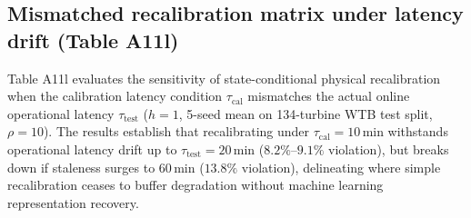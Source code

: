 \documentclass[
  journal]{IEEEtran}
\begin{document}
\FloatBarrier

\subsection*{Mismatched recalibration matrix under latency drift (Table
A11l)}\label{mismatched-recalibration-matrix-under-latency-drift-table-a11l}

Table A11l evaluates the sensitivity of state-conditional physical
recalibration when the calibration latency condition
\(\tau_{\mathrm{cal}}\) mismatches the actual online operational latency
\(\tau_{\mathrm{test}}\) (\(h=1\), 5-seed mean on 134-turbine WTB test
split, \(\rho=10\)). The results establish that recalibrating under
\(\tau_{\mathrm{cal}} = 10\,\)min withstands operational latency drift
up to \(\tau_{\mathrm{test}} = 20\,\)min (\(8.2\%\text{--}9.1\%\)
violation), but breaks down if staleness surges to \(60\,\)min
(\(13.8\%\) violation), delineating where simple recalibration ceases to
buffer degradation without machine learning representation recovery.
\end{document}
